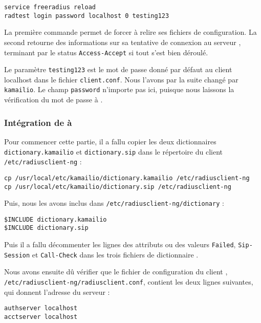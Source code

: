 \begin{verbatim}
service freeradius reload
radtest login password localhost 0 testing123
\end{verbatim}

La première commande permet de forcer {\frad} à relire ses fichiers de configuration. La second retourne des informations sur sa tentative de connexion au serveur {\frad}, terminant par le status \texttt{Access-Accept} si tout s’est bien déroulé.

Le paramètre \texttt{testing123} est le mot de passe donné par défaut au client localhost dans le fichier \texttt{client.conf}. Nous l'avons par la suite changé par \texttt{kamailio}. Le champ \texttt{password} n’importe pas ici, puisque nous laissons la vérification du mot de passe à {\kam}.

\subsubsection{Intégration de {\rad} à {\kam}}

Pour commencer cette partie, il a fallu copier les deux  dictionnaires {\rad} \texttt{dictionary.kamailio} et \texttt{dictionary.sip} dans le répertoire du client {\rad} \texttt{/etc/radiusclient-ng} :

\begin{verbatim}
cp /usr/local/etc/kamailio/dictionary.kamailio /etc/radiusclient-ng
cp /usr/local/etc/kamailio/dictionary.sip /etc/radiusclient-ng
\end{verbatim}

Puis, nous les avons inclus dans \texttt{/etc/radiusclient-ng/dictionary} :

\begin{verbatim}
$INCLUDE dictionary.kamailio
$INCLUDE dictionary.sip
\end{verbatim}

Puis il a fallu décommenter les lignes des attributs ou des valeurs \texttt{Failed}, \texttt{Sip-Session} et \texttt{Call-Check} dans les trois fichiers de dictionnaire {\rad}.

Nous avons ensuite dû vérifier que le fichier de configuration du client {\rad}, \texttt{/etc/radiusclient-ng/radiusclient.conf}, contient les deux lignes suivantes, qui donnent l'adresse du serveur {\rad} :

\begin{verbatim}
authserver localhost
acctserver localhost
\end{verbatim}

